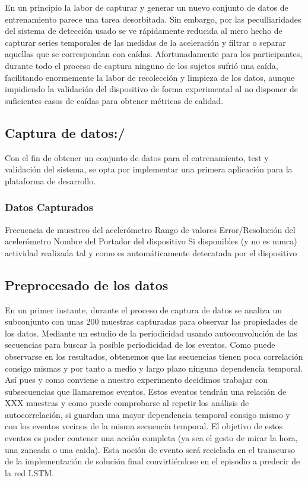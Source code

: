 En un principio la labor de capturar y generar un nuevo conjunto de datos de entrenamiento parece una tarea desorbitada. Sin embargo, por las peculliaridades del sistema de detección usado se ve rápidamente reducida al mero hecho de capturar series temporales de las medidas de la aceleración y filtrar o separar aquellas que se correspondan con caídas. Afortunadamente para los participantes, durante todo el proceso de captura ninguno de los sujetos sufrió una caída, facilitando enormemente la labor de recolección y limpieza de los datos, aunque impidiendo la validación del dispositivo de forma experimental al no disponer de suficientes casos de caídas para obtener métricas de calidad.

\subsection{Captura de datos:\accelcapture/}\label{app:accelcapture}

Con el fin de obtener un conjunto de datos para el entrenamiento, test y validación del sistema, se opta por implementar una primera aplicación para la plataforma de desarrollo.



\subsubsection{Datos Capturados}

Frecuencia de muestreo del acelerómetro
Rango de valores
Error/Resolución del acelerómetro
Nombre del Portador del dispositivo
Si disponibles (y no es nunca) actividad realizada tal y como es automáticamente detecatada por el dispositivo



\subsection{Preprocesado de los datos}

En un primer instante, durante el proceso de captura de datos se analiza un subconjunto con unas 200 muestras capturadas para observar las propiedades de los datos. Mediante un estudio de la periodicidad usando autoconvolución de las secuencias para buscar la posible periodicidad de los eventos. Como puede observarse en los resultados, obtenemos que las secuencias tienen poca correlación consigo mismas y por tanto a medio y largo plazo ninguna dependencia temporal. Así pues y como conviene a nuestro experimento decidimos trabajar con subsecuencias que llamaremos eventos. Estos eventos tendrán una relación de XXX muestras y como puede comprobarse al repetir los análisis de autocorrelación, si guardan una mayor dependencia temporal consigo mismo y con los eventos vecinos de la misma secuencia temporal. El objetivo de estos eventos es poder contener una acción completa (ya sea el gesto de mirar la hora, una zancada o una caida). Esta noción de evento será reciclada en el transcurso de la implementación de solución final convirtiéndose en el episodio a predecir de la red LSTM.


